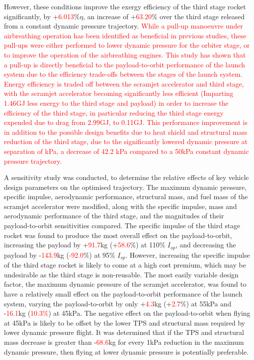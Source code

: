   However, these conditions improve the exergy efficiency of the third stage rocket significantly, by +\textcolor{red}{6.013}\%$\eta$, an increase of +\textcolor{red}{63.20}\% over the third stage released from a constant dynamic pressure trajectory. \textcolor{red}{While a pull-up manoeuvre under airbreathing operation has been identified as beneficial in previous studies\cite{Wilhite1991,Bradford2002,Fujikawa2017}, these pull-ups were either performed to lower dynamic pressure for the orbiter stage\cite{Wilhite1991,Bradford2002}, or to improve the operation of the airbreathing engines\cite{Fujikawa2017}. This study has shown that a pull-up is directly beneficial to the payload-to-orbit performance of the launch system due to the efficiency trade-offs between the stages of the launch system. Energy efficiency is traded off between the scramjet accelerator and third stage, with the scramjet accelerator becoming significantly less efficient (Imparting 1.46GJ less energy to the third stage and payload) in order to increase the efficiency of the third stage, in particular reducing the third stage energy expended due to drag from 2.99GJ, to 0.11GJ. This performance improvement is in addition to the possible design benefits due to heat shield and structural mass reduction of the third stage, due to the significantly lowered dynamic pressure at separation of \secondthirdSeparationqStandardNoReturn kPa, a decrease of 42.2 kPa compared to a 50kPa constant dynamic pressure trajectory.}


A sensitivity study was conducted, to determine the relative effects of key vehicle design parameters on the optimised trajectory. 
The maximum dynamic pressure, specific impulse, aerodynamic performance, structural mass, and fuel mass of the scramjet accelerator were modified, along with the specific impulse, mass and aerodynamic performance of the third stage, and the magnitudes of their payload-to-orbit sensitivities compared. 
The specific impulse of the third stage rocket was found to produce the most overall effect on the payload-to-orbit, increasing the payload by +\textcolor{red}{91.7}kg (+\textcolor{red}{58.6}\%) at 110\% $I_{sp}$, and decreasing the payload by -\textcolor{red}{143.9}kg (\textcolor{red}{-92.0}\%) at 95\% $I_{sp}$. However, increasing the specific impulse of the third stage rocket is likely to come at a high cost premium, which may be undesirable as the third stage is non-reusable. 
The most easily variable design factor, the maximum dynamic pressure of the scramjet accelerator, was found to have a relatively small effect on the payload-to-orbit performance of the launch system, varying the payload-to-orbit by only +\textcolor{red}{4.3}kg (+\textcolor{red}{2.7}\%) at 55kPa and -\textcolor{red}{16.1}kg (\textcolor{red}{10.3\%}) at 45kPa. The negative effect on the payload-to-orbit when flying at 45kPa is likely to be offset by the lower TPS and structural mass required by lower dynamic pressure flight. It was determined that if the TPS and structural mass decrease is greater than -\textcolor{red}{68.6}kg for every 1kPa reduction in the maximum dynamic pressure, then flying at lower dynamic pressure is potentially preferable. 







